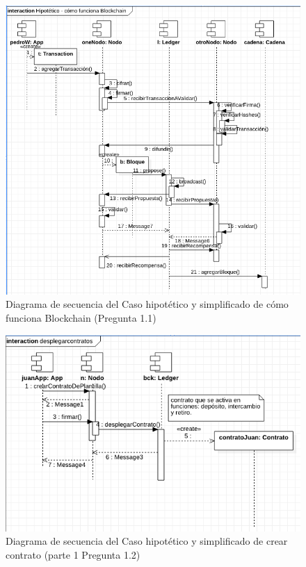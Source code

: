 \begin{figure}
    \centering
    \includegraphics[width=\textwidth]{Pictures/blockchain.png}
    \caption{Diagrama de secuencia del Caso hipotético y simplificado de cómo funciona Blockchain (Pregunta 1.1)}
    \label{fig:p1a}
\end{figure}

\begin{figure}
    \centering
    \includegraphics[width=\textwidth]{Pictures/sc.png}
    \caption{Diagrama de secuencia del Caso hipotético y simplificado de crear contrato (parte 1 Pregunta 1.2)}
    \label{fig:sc}
\end{figure}


